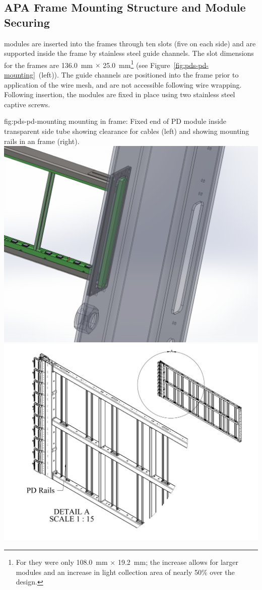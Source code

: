 \subsection{APA Frame Mounting Structure and Module Securing}	
\label{sec:fdsp-pd-assy-frames}

 modules are inserted into the  frames through ten slots (five on each side) and are supported inside the frame by stainless steel guide channels.  The slot dimensions for the   frames 
are \SI{136.0}{mm} $\times$ \SI{25.0}{mm}\footnote{For  they were only \SI{108.0}{mm} $\times$ \SI{19.2}{mm}; the increase allows for larger  modules and an increase in light collection area of nearly 50\% over the  design.}   
(see Figure~\ref{fig:pds-pd-mounting}~(left)).
The guide channels are positioned into the  frame prior to application of the wire mesh, and are not accessible following wire wrapping. Following insertion, the  modules are fixed in place using two stainless steel captive screws.

\begin{dunefigure}{fig:pds-pd-mounting}
{ mounting in  frame: Fixed end of PD module inside transparent  side tube showing clearance for  cables (left) and showing  mounting rails in an  frame  (right).}
	\includegraphics[height=6.cm]{graphics/pds-apa-pd-mounting-fixation}
	\includegraphics[height=6.cm]{graphics/pds-apa-pd-rails}
\end{dunefigure}

